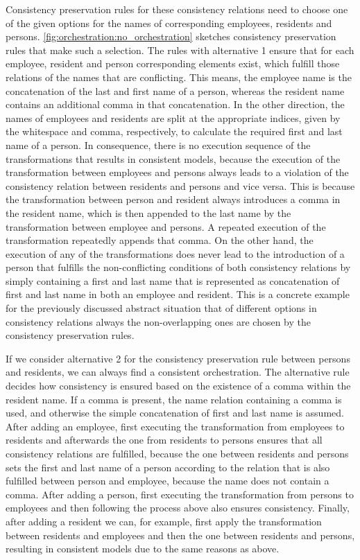 Consistency preservation rules for these consistency relations need to choose one of the given options for the names of corresponding employees, residents and persons.
\autoref{fig:orchestration:no_orchestration} sketches consistency preservation rules that make such a selection.
The rules with alternative 1 ensure that for each employee, resident and person corresponding elements exist, which fulfill those relations of the names that are conflicting.
This means, the employee name is the concatenation of the last and first name of a person, whereas the resident name contains an additional comma in that concatenation.
In the other direction, the names of employees and residents are split at the appropriate indices, given by the whitespace and comma, respectively, to calculate the required first and last name of a person.
In consequence, there is no execution sequence of the transformations that results in consistent models, because the execution of the transformation between employees and persons always leads to a violation of the consistency relation between residents and persons and vice versa.
This is because the transformation between person and resident always introduces a comma in the resident name, which is then appended to the last name by the transformation between employee and persons.
A repeated execution of the transformation repeatedly appends that comma.
On the other hand, the execution of any of the transformations does never lead to the introduction of a person that fulfills the non-conflicting conditions of both consistency relations by simply containing a first and last name that is represented as concatenation of first and last name in both an employee and resident.
This is a concrete example for the previously discussed abstract situation that of different options in consistency relations always the non-overlapping ones are chosen by the consistency preservation rules.

If we consider alternative 2 for the consistency preservation rule between persons and residents, we can always find a consistent orchestration.
The alternative rule decides how consistency is ensured based on the existence of a comma within the resident name.
If a comma is present, the name relation containing a comma is used, and otherwise the simple concatenation of first and last name is assumed.
After adding an employee, first executing the transformation from employees to residents and afterwards the one from residents to persons ensures that all consistency relations are fulfilled, because the one between residents and persons sets the first and last name of a person according to the relation that is also fulfilled between person and employee, because the name does not contain a comma.
After adding a person, first executing the transformation from persons to employees and then following the process above also ensures consistency.
Finally, after adding a resident we can, for example, first apply the transformation between residents and employees and then the one between residents and persons, resulting in consistent models due to the same reasons as above.

